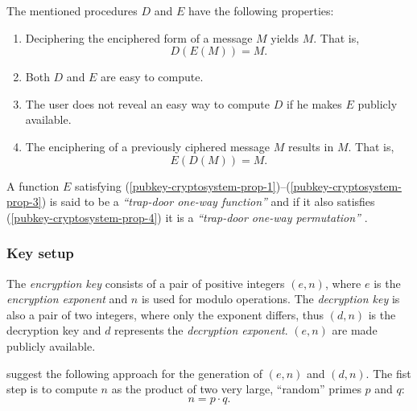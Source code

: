 The mentioned procedures $D$ and $E$ have the following properties:
\begin{enumerate}
\renewcommand{\theenumi}{\alph{enumi}}
\renewcommand{\labelenumi}{(\theenumi)}

\item Deciphering  the enciphered form of  a message $M$  yields $M$. That
  is,
  \begin{equation}
    \label{eq:1}
    D(E(M)) = M.
  \end{equation}
  \label{pubkey-cryptosystem-prop-1}
\item Both $D$ and $E$ are easy to compute.
  \label{pubkey-cryptosystem-prop-2}
\item The user does not reveal an  easy way to compute $D$ if he makes $E$
  publicly available.
  \label{pubkey-cryptosystem-prop-3}
\item  The enciphering  of a  previously ciphered  message $M$  results in
  $M$. That is,
  \begin{equation}
    \label{eq:2}
    E(D(M)) = M.
  \end{equation}
  \label{pubkey-cryptosystem-prop-4}
\end{enumerate}

A                  function                 $E$                 satisfying
(\ref{pubkey-cryptosystem-prop-1})--(\ref{pubkey-cryptosystem-prop-3})   is
said  to  be  a  \emph{``trap-door  one-way function''}  and  if  it  also
satisfies  (\ref{pubkey-cryptosystem-prop-4})  it  is a  \emph{``trap-door
  one-way permutation''} \cite{rivest77method,diffie76new}.

\subsubsection{Key setup}

The \emph{encryption  key} consists  of a pair  of positive  integers $(e,
n)$,  where $e$  is the  \emph{encryption exponent}  and $n$  is  used for
modulo  operations.  The \emph{decryption  key}  is  also  a pair  of  two
integers, where only the exponent differs, thus $(d, n)$ is the decryption
key and $d$  represents the \emph{decryption exponent}. $(e,  n)$ are made
publicly available.

\citet*{rivest77method} suggest the  following approach for the generation
of $(e, n)$ and  $(d, n)$. The fist step is to  compute $n$ as the product
of two very large, ``random'' primes $p$ and $q$:
\begin{equation*}
  \label{eq:compute-n}
n = p \cdot q.
\end{equation*}

